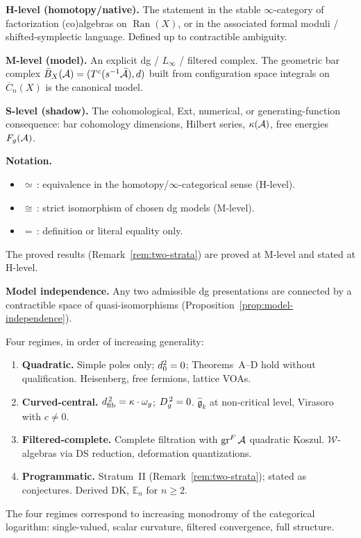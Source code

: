 \begin{convention}
\label{conv:hms-levels}

\smallskip\noindent\textbf{H-level (homotopy/native).}
The statement in the stable $\infty$-category of factorization
(co)algebras on $\operatorname{Ran}(X)$, or in the associated
formal moduli / shifted-symplectic language.  Defined up to
contractible ambiguity.

\smallskip\noindent\textbf{M-level (model).}
An explicit dg / $L_\infty$ / filtered complex.  The geometric
bar complex $\bar{B}_X(\mathcal{A}) = (T^c(s^{-1}\bar{\mathcal{A}}), d)$ built
from configuration space integrals on $\overline{C}_n(X)$ is the
canonical model.

\smallskip\noindent\textbf{S-level (shadow).}
The cohomological, Ext, numerical, or generating-function
consequence: bar cohomology dimensions, Hilbert series,
$\kappa(\mathcal{A})$, free energies $F_g(\mathcal{A})$.

\smallskip\noindent\textbf{Notation.}
\begin{itemize}
\item $\simeq$\,: equivalence in the homotopy/$\infty$-categorical
  sense (H-level).
\item $\cong$\,: strict isomorphism of chosen dg models (M-level).
\item $=$\,: definition or literal equality only.
\end{itemize}
The proved results (Remark~\ref{rem:two-strata}) are proved at
M-level and stated at H-level.

\smallskip\noindent\textbf{Model independence.}
Any two admissible dg presentations are connected by a contractible
space of quasi-isomorphisms
(Proposition~\ref{prop:model-independence}).
\end{convention}

\begin{convention}\label{conv:regime-tags}\label{conv:proof-architecture}
Four regimes, in order of increasing generality:
\begin{enumerate}
\item \textbf{Quadratic.}  Simple poles only; $d_0^2 = 0$;
  Theorems~A--D hold without qualification.
  Heisenberg, free fermions, lattice VOAs.
\item \textbf{Curved-central.}
  $d_{\mathrm{fib}}^{\,2} = \kappa \cdot \omega_g$; $D_{g}^{\,2} = 0$.
  $\widehat{\mathfrak{g}}_k$ at non-critical level, Virasoro
  with $c \neq 0$.
\item \textbf{Filtered-complete.}  Complete filtration with
  $\operatorname{gr}^F \mathcal{A}$ quadratic Koszul.
  $\mathcal{W}$-algebras via DS reduction, deformation
  quantizations.
\item \textbf{Programmatic.}  Stratum~II
  (Remark~\ref{rem:two-strata}); stated as conjectures.
  Derived DK, $\mathbb{E}_n$ for $n \geq 2$.
\end{enumerate}
The four regimes correspond to increasing monodromy of the
categorical logarithm: single-valued, scalar curvature, filtered
convergence, full structure.
\end{convention}

